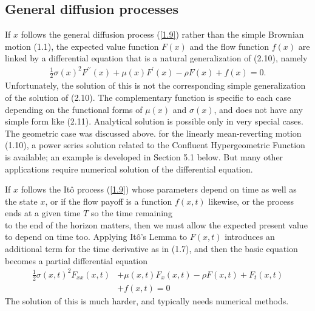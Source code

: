 \documentclass[12pt]{article}
\theoremstyle{definition}
\begin{document}
\subsection{General diffusion processes}
If $x$ follows the general diffusion process (\ref{1.9}) rather than the simple Brownian motion (1.1), the expected value function $F(x)$ and the flow function $f(x)$ are linked by a differential equation that is a natural generalization of (2.10), namely
\begin{align}
\frac{1}{2} \sigma(x)^{2} F^{\prime \prime}(x)+\mu(x) F^{\prime}(x)-\rho F(x)+f(x)=0 . \label{2.18}
\end{align}
Unfortunately, the solution of this is not the corresponding simple generalization of the solution of (2.10). The complementary function is specific to each case depending on the functional forms of $\mu(x)$ and $\sigma(x)$, and does not have any simple form like (2.11). Analytical solution is possible only in very special cases. The geometric case was discussed above. for the linearly mean-reverting motion (1.10), a power series solution related to the Confluent Hypergeometric Function is available; an example is developed in Section 5.1 below. But many other applications require numerical solution of the differential equation.

If $x$ follows the Itô process (\ref{1.9}) whose parameters depend on time as well as the state $x$, or if the flow payoff is a function $f(x, t)$ likewise, or the process ends at a given time $T$ so the time remaining\\
to the end of the horizon matters, then we must allow the expected present value to depend on time too. Applying Itô's Lemma to $F(x, t)$ introduces an additional term for the time derivative as in (1.7), and then the basic equation becomes a partial differential equation
\begin{align}
\frac{1}{2} \sigma(x, t)^{2} F_{x x}(x, t) & +\mu(x, t) F_{x}(x, t)-\rho F(x, t)+F_{t}(x, t) \\
& +f(x, t)=0
\label{2.19}
\end{align}
The solution of this is much harder, and typically needs numerical methods.
\end{document}
